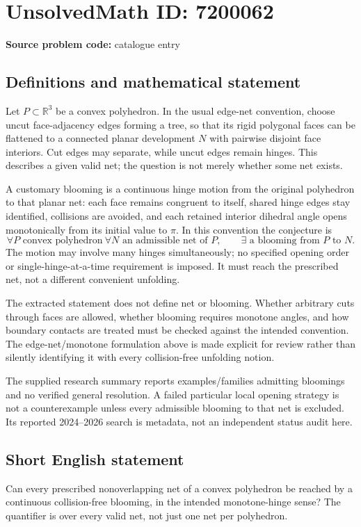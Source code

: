 \documentclass[11pt]{article}
\newcommand{\R}{\mathbb{R}}
\begin{document}
\section*{UnsolvedMath ID: 7200062}
\textbf{Source problem code:} catalogue entry
\subsection{Definitions and mathematical statement}
Let \(P\subset\R^3\) be a convex polyhedron. In the usual edge-net convention, choose uncut face-adjacency edges forming a tree, so that its rigid polygonal faces can be flattened to a connected planar development \(N\) with pairwise disjoint face interiors. Cut edges may separate, while uncut edges remain hinges. This describes a given valid net; the question is not merely whether some net exists.

A customary blooming is a continuous hinge motion from the original polyhedron to that planar net: each face remains congruent to itself, shared hinge edges stay identified, collisions are avoided, and each retained interior dihedral angle opens monotonically from its initial value to \(\pi\). In this convention the conjecture is
\[
\forall P\text{ convex polyhedron}\ \forall N\text{ an admissible net of }P,
\qquad \exists\text{ a blooming from }P\text{ to }N.
\]
The motion may involve many hinges simultaneously; no specified opening order or single-hinge-at-a-time requirement is imposed. It must reach the prescribed net, not a different convenient unfolding.

The extracted statement does not define net or blooming. Whether arbitrary cuts through faces are allowed, whether blooming requires monotone angles, and how boundary contacts are treated must be checked against the intended convention. The edge-net/monotone formulation above is made explicit for review rather than silently identifying it with every collision-free unfolding notion.

The supplied research summary reports examples/families admitting bloomings and no verified general resolution. A failed particular local opening strategy is not a counterexample unless every admissible blooming to that net is excluded. Its reported 2024--2026 search is metadata, not an independent status audit here.
\subsection{Short English statement}
Can every prescribed nonoverlapping net of a convex polyhedron be reached by a continuous collision-free blooming, in the intended monotone-hinge sense? The quantifier is over every valid net, not just one net per polyhedron.
\end{document}
